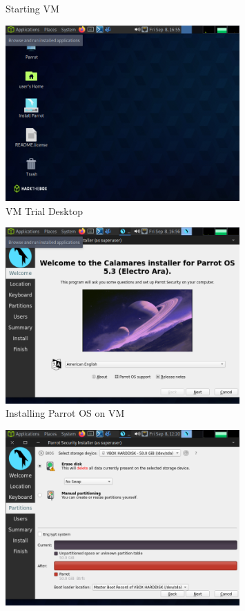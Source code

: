 \documentclass[12pt]{article}
\newenvironment{problem}[2][Problem]{\begin{trivlist}
\item[\hskip \labelsep {\bfseries #1}\hskip \labelsep {\bfseries #2.}]}{\end{trivlist}}
\begin{document}
\begin{problem}{1}
\begin{figure}[H]
        \caption{Starting VM}
    \end{figure}
    \begin{figure}[H]
        \centering
        \includegraphics[width=0.8\textwidth]{parrot_install2}
        \caption{VM Trial Desktop}
    \end{figure}
    \begin{figure}[H]
        \centering
        \includegraphics[width=0.8\textwidth]{parrot_install3}
        \caption{Installing Parrot OS on VM}
    \end{figure}
    \begin{figure}[H]
        \centering
        \includegraphics[width=0.8\textwidth]{parrot_install4}

\end{figure}
\end{problem}
\end{document}
